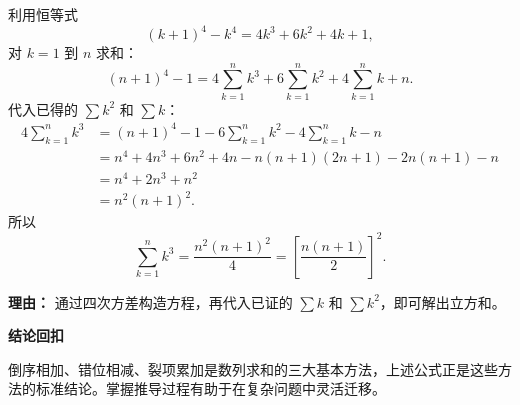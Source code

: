 \begin{proofbox}
\begin{description}[style=nextline, leftmargin=2.8em, labelsep=0.5em, itemsep=0.55em]
		\item[\textbf{步骤四（立方和裂项）：}]
		      利用恒等式
		      \[
			      (k+1)^4-k^4=4k^3+6k^2+4k+1,
		      \]
		      对 \(k=1\) 到 \(n\) 求和：
		      \[
			      (n+1)^4-1=4\sum_{k=1}^{n}k^3+6\sum_{k=1}^{n}k^2+4\sum_{k=1}^{n}k+n.
		      \]
		      代入已得的 \(\sum k^2\) 和 \(\sum k\)：
		      \[
			      \begin{aligned}
				      4\sum_{k=1}^{n}k^3
				       & =(n+1)^4-1-6\sum_{k=1}^{n}k^2-4\sum_{k=1}^{n}k-n \\
				       & =n^4+4n^3+6n^2+4n-n(n+1)(2n+1)-2n(n+1)-n         \\
				       & =n^4+2n^3+n^2                                    \\
				       & =n^2(n+1)^2.
			      \end{aligned}
		      \]
		      所以
		      \[
			      \sum_{k=1}^{n}k^3=\frac{n^2(n+1)^2}{4}=\left[\frac{n(n+1)}{2}\right]^2.
		      \]
		      \par\textbf{理由：} 通过四次方差构造方程，再代入已证的 \(\sum k\) 和 \(\sum k^2\)，即可解出立方和。
	\end{description}

	\medskip
	\textbf{\textcolor{CProof}{结论回扣}}

	倒序相加、错位相减、裂项累加是数列求和的三大基本方法，上述公式正是这些方法的标准结论。掌握推导过程有助于在复杂问题中灵活迁移。
\end{proofbox}